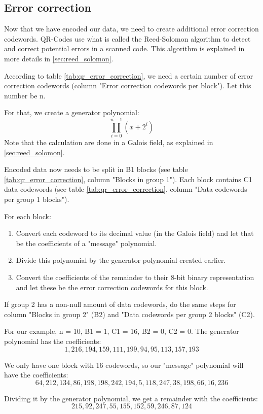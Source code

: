 \subsection{Error correction}
\label{ssec:qr_error_corection}

Now that we have encoded our data, we need to create additional error correction codewords. QR-Codes use what is called the Reed-Solomon algorithm to detect and correct potential errors in a scanned code. This algorithm is explained in more details in \autoref{sec:reed_solomon}.

According to table \ref{tab:qr_error_correction}, we need a certain number of error correction codewords (column "Error correction codewords per block"). Let this number be n.

For that, we create a generator polynomial: \[
  \prod_{i = 0}^{n-1} (x + 2^i)
\]
Note that the calculation are done in a Galois field, as explained in \autoref{sec:reed_solomon}.

Encoded data now needs to be split in B1 blocks (see table \ref{tab:qr_error_correction}, column "Blocks in group 1"). Each block contains C1 data codewords (see table \ref{tab:qr_error_correction}, column "Data codewords per group 1 blocks").

For each block:
\begin{enumerate}
  \item Convert each codeword to its decimal value (in the Galois field) and let that be the coefficients of a "message" polynomial.
  \item Divide this polynomial by the generator polynomial created earlier.
  \item Convert the coefficients of the remainder to their 8-bit binary representation and let these be the error correction codewords for this block.
\end{enumerate}

If group 2 has a non-null amount of data codewords, do the same steps for column "Blocks in group 2" (B2) and "Data codewords per group 2 blocks" (C2).

For our example, n = 10, B1 = 1, C1 = 16, B2 = 0, C2 = 0.
The generator polynomial has the coefficients: \[
  1, 216, 194, 159, 111, 199, 94, 95, 113, 157, 193
\]

We only have one block with 16 codewords, so our "message" polynomial will have the coefficients: \[
  64, 212, 134, 86, 198, 198, 242, 194, 5, 118, 247, 38, 198, 66, 16, 236
\]

Dividing it by the generator polynomial, we get a remainder with the coefficients: \[
  215, 92, 247, 55, 155, 152, 59, 246, 87, 124
\]

